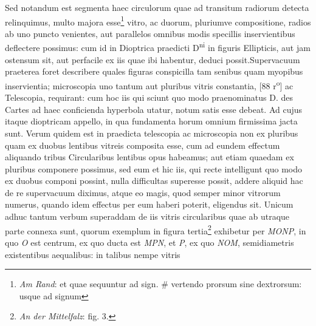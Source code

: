 \pstart  Sed notandum est segmenta haec circulorum quae ad transitum radiorum detecta relinquimus, multo majora esse\footnote{\textit{Am Rand}:  et quae sequuntur ad sign.  \#\hspace{-8.8pt}{$\Circle$} vertendo prorsum sine dextrorsum: usque ad signum \protect{}} vitro, ac duorum, pluriumve compositione, radios ab uno puncto venientes, aut parallelos omnibus modis specillis\protect{} inservientibus deflectere possimus: cum id in Dioptrica praedicti D\textsuperscript{ni}  in figuris Ellipticis, aut jam ostensum sit, aut perfacile ex iis quae ibi habentur, deduci possit.\pend \pstart Supervacuum praeterea foret describere quales figuras conspicilla tam senibus quam myopibus\protect{} inservientia; microscopia\protect{} uno tantum aut pluribus vitris constantia,
[88 r\textsuperscript{o}] ac Telescopia\protect{}, requirant: cum hoc iis qui sciunt quo modo praenominatus D. des Cartes\protect{} ad haec conficienda hyperbola utatur, notum satis esse debeat. Ad cujus itaque dioptricam\protect{} appello, in qua fundamenta horum omnium firmissima jacta sunt. Verum quidem est in praedicta  telescopia\protect{} ac microscopia\protect{} non ex pluribus quam ex duobus lentibus\protect{} vitreis composita esse, cum ad eundem effectum aliquando tribus Circularibus lentibus\protect{} opus habeamus; aut etiam quaedam ex pluribus componere possimus, sed eum et hic iis, qui recte intelligunt quo modo ex duobus componi possint, nulla difficultas superesse possit, addere aliquid hac de re supervacuum diximus, atque eo magis, quod semper minor vitrorum numerus, quando idem effectus per eum haberi poterit, eligendus sit. Unicum adhuc tantum verbum superaddam de iis vitris circularibus quae ab utraque parte connexa sunt, quorum exemplum in figura tertia\footnote{\textit{An der Mittelfalz}: fig. 3.{\vrule height 0pt depth 10mm width 0pt}} exhibetur per \textit{MONP}, in quo \textit{O} est centrum, ex quo ducta est \textit{MPN}, et \textit{P}, ex quo \textit{NOM}, semidiametris existentibus aequalibus: in talibus nempe vitris 